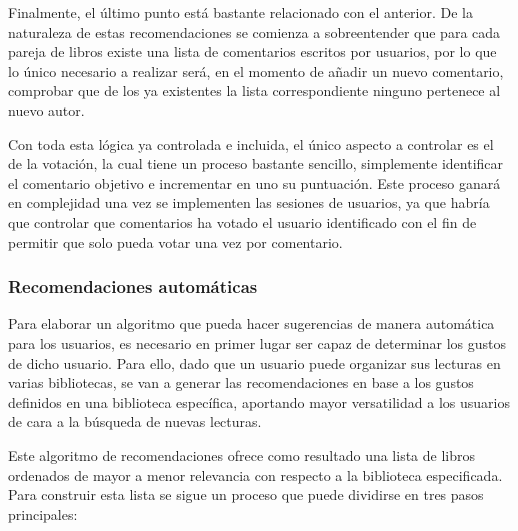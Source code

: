 Finalmente, el último punto está bastante relacionado con el anterior. De la naturaleza de estas recomendaciones se comienza a sobreentender que para cada pareja de libros existe una lista de comentarios escritos por usuarios, por lo que lo único necesario a realizar será, en el momento de añadir un nuevo comentario, comprobar que de los ya existentes la lista correspondiente ninguno pertenece al nuevo autor.

Con toda esta lógica ya controlada e incluida, el único aspecto a controlar es el de la votación, la cual tiene un proceso bastante sencillo, simplemente identificar el comentario objetivo e incrementar en uno su puntuación. Este proceso ganará en complejidad una vez se implementen las sesiones de usuarios, ya que habría que controlar que comentarios ha votado el usuario identificado con el fin de permitir que solo pueda votar una vez por comentario.

\subsubsection{Recomendaciones automáticas}

Para elaborar un algoritmo que pueda hacer sugerencias de manera automática para los usuarios, es necesario en primer lugar ser capaz de determinar los gustos de dicho usuario. Para ello, dado que un usuario puede organizar sus lecturas en varias bibliotecas, se van a generar las recomendaciones en base a los gustos definidos en una biblioteca específica, aportando mayor versatilidad a los usuarios de cara a la búsqueda de nuevas lecturas.

Este algoritmo de recomendaciones ofrece como resultado una lista de libros ordenados de mayor a menor relevancia con respecto a la biblioteca especificada. Para construir esta lista se sigue un proceso que puede dividirse en tres pasos principales:

